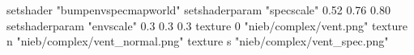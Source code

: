 setshader "bumpenvspecmapworld"
setshaderparam "specscale" 0.52 0.76 0.80
setshaderparam "envscale"  0.3 0.3 0.3
   texture 0 "nieb/complex/vent.png"
   texture n "nieb/complex/vent_normal.png"
   texture s "nieb/complex/vent_spec.png"